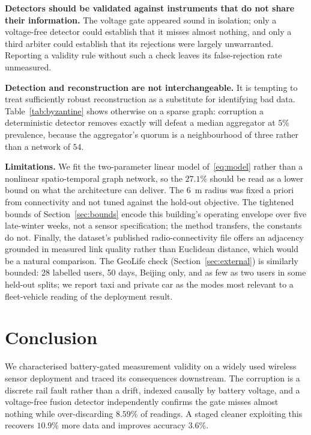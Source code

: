 \documentclass[conference]{IEEEtran}
\begin{document}
\textbf{Detectors should be validated against instruments that do not share
their information.} The voltage gate appeared sound in isolation; only a
voltage-free detector could establish that it misses almost nothing, and only a
third arbiter could establish that its rejections were largely unwarranted.
Reporting a validity rule without such a check leaves its false-rejection rate
unmeasured.

\textbf{Detection and reconstruction are not interchangeable.} It is tempting
to treat sufficiently robust reconstruction as a substitute for identifying bad
data. Table~\ref{tab:byzantine} shows otherwise on a sparse graph: corruption a
deterministic detector removes exactly will defeat a median aggregator at $5\%$
prevalence, because the aggregator's quorum is a neighbourhood of three rather
than a network of $54$.

\textbf{Limitations.} We fit the two-parameter linear model
of~\eqref{eq:model} rather than a nonlinear spatio-temporal graph network, so
the $27.1\%$ should be read as a lower bound on what the architecture can
deliver. The $6$~m radius was fixed a priori from connectivity and not tuned
against the hold-out objective. The tightened bounds of
Section~\ref{sec:bounds} encode this building's operating envelope over five
late-winter weeks, not a sensor specification; the method transfers, the
constants do not. Finally, the dataset's published radio-connectivity file
offers an adjacency grounded in measured link quality rather than Euclidean
distance, which would be a natural comparison. The GeoLife check
(Section~\ref{sec:external}) is similarly bounded: 28 labelled users, 50
days, Beijing only, and as few as two users in some held-out splits; we
report taxi and private car as the modes most relevant to a fleet-vehicle
reading of the deployment result.

\section{Conclusion}

We characterised battery-gated measurement validity on a widely used wireless
sensor deployment and traced its consequences downstream. The corruption is a
discrete rail fault rather than a drift, indexed causally by battery voltage,
and a voltage-free fusion detector independently confirms the gate misses
almost nothing while over-discarding $8.59\%$ of readings. A staged cleaner
exploiting this recovers $10.9\%$ more data and improves accuracy $3.6\%$.
\end{document}
